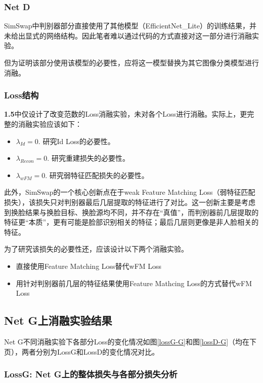 \documentclass[a4paper]{article}
\begin{document}
\subsubsection{Net D}

SimSwap中判别器部分直接使用了其他模型（EfficientNet\_Lite）的训练结果，并未给出显式的网络结构。因此笔者难以通过代码的方式直接对这一部分进行消融实验。

但为证明该部分使用该模型的必要性，应将这一模型替换为其它图像分类模型进行消融。

\subsubsection{Loss结构}

\textbf{1.5}中仅设计了改变范数的Loss消融实验，未对各个Loss进行消融。实际上，更完整的消融实验应该如下：

\begin{itemize}
    \item $\lambda_{Id}=0.$ 研究Id Loss的必要性。
    \item $\lambda_{Recon}=0.$ 研究重建损失的必要性。
    \item $\lambda_{wFM}=0.$ 研究弱特征匹配损失的必要性。
\end{itemize}

此外，SimSwap的一个核心创新点在于weak Feature Matching Loss（弱特征匹配损失），该损失只对判别器最后几层提取的特征进行了对比。这一创新主要是考虑到换脸结果与换脸目标、换脸源均不同，并不存在“真值”，而判别器前几层提取的特征更“本质”，更有可能是脸部识别相关的特征；最后几层则更像是非人脸相关的特征。

为了研究该损失的必要性还，应该设计以下两个消融实验。

\begin{itemize}
    \item 直接使用Feature Matching Loss替代wFM Loss
    \item 用针对判别器前几层的特征结果使用Feature Mathcing Loss的方式替代wFM Loss
\end{itemize}


\subsection{Net G上消融实验结果}

Net G不同消融实验下各部分Loss的变化情况如图\ref{lossG-G}和图\ref{lossD-G}（均在下页），两者分别为LossG和LossD的变化情况对比。

\subsubsection{LossG: Net G上的整体损失与各部分损失分析}
\end{document}
